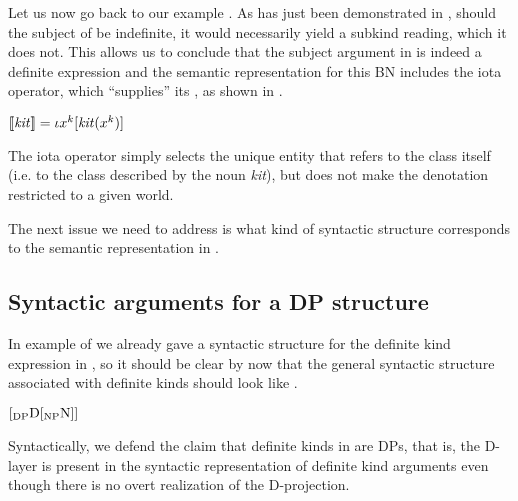 \documentclass[output=paper
,modfonts
,nonflat]{langsci/langscibook}
\begin{document}
	Let us now go back to our example . As has just been demonstrated in , should the subject of  be indefinite, it would necessarily yield a subkind reading, which it does not. This allows us to conclude that the subject argument in  is indeed a definite expression and the semantic representation for this BN includes the iota operator, which ``supplies'' its , as shown in .
	
	\ea \label{ex:borik:13}
	$[\![\text{\textit{kit}}]\!] = \iota{x^k}[\mbox{\textit{kit}}(x^k)]$
	\z
	
	The iota operator simply selects the unique entity that refers to the class itself (i.e. to the class described by the noun \textit{kit}), but does not make the denotation restricted to a given world. 
	
	The next issue we need to address is what kind of syntactic structure corresponds to the semantic representation in . 
	
	\subsection{Syntactic arguments for a DP structure} \label{sec:borik:3.2}
	
	In example  of  we already gave a syntactic structure for the definite kind expression in , so it should be clear by now that the general syntactic structure associated with definite kinds should look like . 
	
	\ea\label{ex:borik:14}
	$[_{\mbox{\scriptsize{DP}}} \mbox{D} [_{\mbox{\scriptsize{NP}}} \mbox{N}]]$
	\z
	
	Syntactically, we defend the claim that definite kinds in  are DPs, that is, the D-layer is present in the syntactic representation of definite kind arguments even though there is no overt realization of the D-projection. 
	
\end{document}
